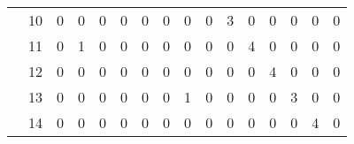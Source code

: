 \documentclass[12pt]{article}
\begin{document}
\begin{enumerate}
\begin{table}[H]
\begin{tabular}{@{}llllllllllllllll@{}}
\cellcolor[HTML]{34FF34}                                   & \cellcolor[HTML]{34FF34}10 & 0                         & 0                         & 0                         & 0                         & 0                         & 0                         & 0                         & 0                         & 3                          & 0                          & 0                          & 0                          & 0                          & 0                          \\
\cellcolor[HTML]{34FF34}                                   & \cellcolor[HTML]{34FF34}11 & 0                         & 1                         & 0                         & 0                         & 0                         & 0                         & 0                         & 0                         & 0                          & 4                          & 0                          & 0                          & 0                          & 0                          \\
\cellcolor[HTML]{34FF34}                                   & \cellcolor[HTML]{34FF34}12 & 0                         & 0                         & 0                         & 0                         & 0                         & 0                         & 0                         & 0                         & 0                          & 0                          & 4                          & 0                          & 0                          & 0                          \\
\cellcolor[HTML]{34FF34}                                   & \cellcolor[HTML]{34FF34}13 & 0                         & 0                         & 0                         & 0                         & 0                         & 0                         & 1                         & 0                         & 0                          & 0                          & 0                          & 3                          & 0                          & 0                          \\
\cellcolor[HTML]{34FF34}                                   & \cellcolor[HTML]{34FF34}14 & 0                         & 0                         & 0                         & 0                         & 0                         & 0                         & 0                         & 0                         & 0                          & 0                          & 0                          & 0                          & 4                          & 0                          \\

\end{tabular}
\end{table}
\end{enumerate}
\end{document}

